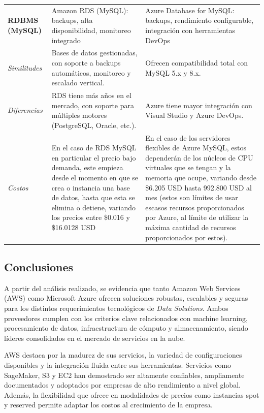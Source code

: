\documentclass[12pt]{article}
\begin{document}
\begin{longtable}{|>{\RaggedRight\arraybackslash}p{4cm}|>{\RaggedRight\arraybackslash}p{5cm}|>{\RaggedRight\arraybackslash}p{5cm}|}
		\textbf{RDBMS (MySQL)} & Amazon RDS (MySQL): backups, alta disponibilidad, monitoreo integrado & Azure Database for MySQL: backups, rendimiento configurable, integración con herramientas DevOps \\
		\textit{Similitudes} & Bases de datos gestionadas, con soporte a backups automáticos, monitoreo y escalado vertical. & Ofrecen compatibilidad total con MySQL 5.x y 8.x. \\
		\textit{Diferencias} & RDS tiene más años en el mercado, con soporte para múltiples motores (PostgreSQL, Oracle, etc.). & Azure tiene mayor integración con Visual Studio y Azure DevOps. \\
		\textit{Costos} & En el caso de RDS MySQL en particular el precio bajo demanda, este empieza desde el momento en que se crea o instancia una base de datos, hasta que esta se elimina o detiene, variando los precios entre \$0.016 y \$16.0128 USD & En el caso de los servidores flexibles de Azure MySQL, estos dependerán de los núcleos de CPU virtuales que se tengan y la memoria que ocupe, variando desde \$6.205 USD hasta 992.800 USD al mes (estos son límites de usar escasos recursos proporcionados por Azure, al límite de utilizar la máxima cantidad de recursos proporcionados por estos). \\
		\hline
	\end{longtable}
	
	
	\subsection{Conclusiones}
	
	A partir del análisis realizado, se evidencia que tanto Amazon Web Services (AWS) como Microsoft Azure ofrecen soluciones robustas, escalables y seguras para los distintos requerimientos tecnológicos de \textit{Data Solutions}. Ambos proveedores cumplen con los criterios clave relacionados con machine learning, procesamiento de datos, infraestructura de cómputo y almacenamiento, siendo líderes consolidados en el mercado de servicios en la nube.
	
	AWS destaca por la madurez de sus servicios, la variedad de configuraciones disponibles y la integración fluida entre sus herramientas. Servicios como SageMaker, S3 y EC2 han demostrado ser altamente confiables, ampliamente documentados y adoptados por empresas de alto rendimiento a nivel global. Además, la flexibilidad que ofrece en modalidades de precios como instancias spot y reserved permite adaptar los costos al crecimiento de la empresa.
	
\end{document}
